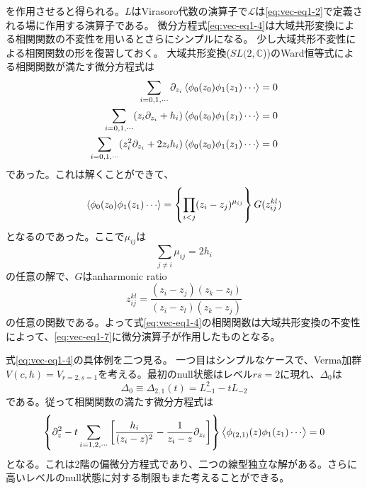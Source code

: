 \documentclass[11pt, aps, longbibliography]{article}
\numberwithin{equation}{section}
\begin{document}
        を作用させると得られる。$L$はVirasoro代数の演算子で$\mathcal{L}$は\eqref{eq:vec-eq1-2}で定義される場に作用する演算子である。
        微分方程式\eqref{eq:vec-eq1-4}は大域共形変換による相関関数の不変性を用いるとさらにシンプルになる。
        少し大域共形不変性による相関関数の形を復習しておく。
        大域共形変換($SL(2,\mathbb{C}$))のWard恒等式による相関関数が満たす微分方程式は
        \begin{align}\label{eq:vec-eq1-6}
            \sum_{i=0,1,\cdots}\partial_{z_i}\expval{\phi_0(z_0)\phi_1(z_1)\cdots} &= 0 \notag \\
            \sum_{i=0,1,\cdots}(z_i\partial_{z_i}+h_i)\expval{\phi_0(z_0)\phi_1(z_1)\cdots} &= 0 \\
            \sum_{i=0,1,\cdots}(z_i^2\partial_{z_i}+2z_ih_i)\expval{\phi_0(z_0)\phi_1(z_1)\cdots} &= 0 \notag
        \end{align}
        であった。これは解くことができて、
        \begin{equation}\label{eq:vec-eq1-7}
            \expval{\phi_0(z_0)\phi_1(z_1)\cdots}  = \left\{ \prod_{i<j} (z_i-z_j)^{\mu_{ij}} \right\}G({z_{ij}^{kl}})
        \end{equation}
        となるのであった。ここで$\mu_{ij}$は
        \begin{equation}\label{eq:vec-eq1-8}
            \sum_{j\neq i}\mu_{ij} = 2h_i
        \end{equation}
        の任意の解で、$G$はanharmonic ratio
        \begin{equation}\label{eq:vec-eq1-9}
            z_{ij}^{kl} = \frac{(z_i-z_j)(z_k-z_l)}{(z_i-z_l)(z_k-z_j)}
        \end{equation}
        の任意の関数である。よって式\eqref{eq:vec-eq1-4}の相関関数は大域共形変換の不変性によって、\eqref{eq:vec-eq1-7}に微分演算子が作用したものとなる。

        式\eqref{eq:vec-eq1-4}の具体例を二つ見る。
        一つ目はシンプルなケースで、Verma加群$V(c,h)=V_{r=2,s=1}$を考える。最初のnull状態はレベル$rs=2$に現れ、$\Delta_0$は
        \begin{equation}\label{eq:vec-eq1-10}
            \Delta_0 \equiv \Delta_{2,1}(t) = L_{-1}^2 - tL_{-2}
        \end{equation}
        である。従って相関関数の満たす微分方程式は
        \begin{equation}\label{eq:vec-eq1-11}
            \left\{ \partial_z^2 -t\sum_{i=1,2,\cdots}\left[ \frac{h_i}{(z_i-z)^2} - \frac{1}{z_i-z}\partial_{z_i} \right] \right\} \expval{\phi_{(2,1)}(z)\phi_1(z_1)\cdots} = 0
        \end{equation}
        となる。これは2階の偏微分方程式であり、二つの線型独立な解がある。さらに高いレベルのnull状態に対する制限もまた考えることができる。
\end{document}
